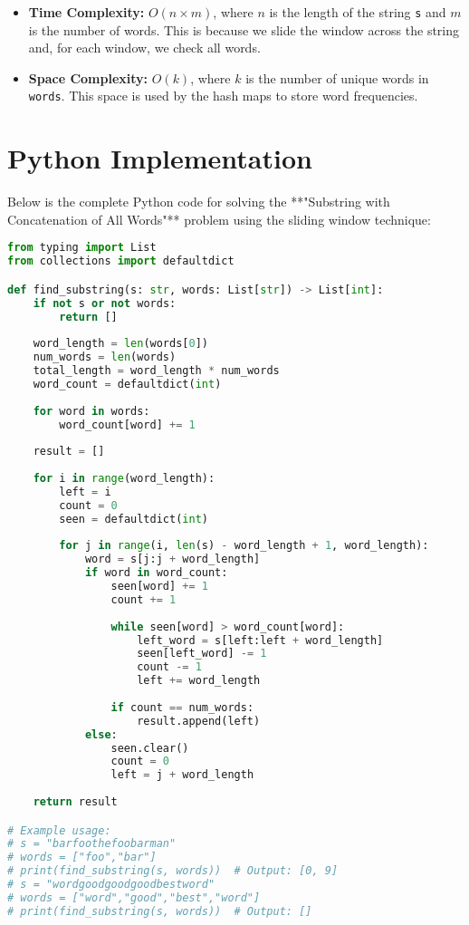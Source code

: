 \begin{itemize}
    \item \textbf{Time Complexity:} \(O(n \times m)\), where \(n\) is the length of the string \texttt{s} and \(m\) is the number of words. This is because we slide the window across the string and, for each window, we check all words.
    \item \textbf{Space Complexity:} \(O(k)\), where \(k\) is the number of unique words in \texttt{words}. This space is used by the hash maps to store word frequencies.
\end{itemize}

\section*{Python Implementation}


Below is the complete Python code for solving the **"Substring with Concatenation of All Words"** problem using the sliding window technique:

\begin{fullwidth}
\begin{lstlisting}[language=Python]
from typing import List
from collections import defaultdict

def find_substring(s: str, words: List[str]) -> List[int]:
    if not s or not words:
        return []
    
    word_length = len(words[0])
    num_words = len(words)
    total_length = word_length * num_words
    word_count = defaultdict(int)
    
    for word in words:
        word_count[word] += 1
    
    result = []
    
    for i in range(word_length):
        left = i
        count = 0
        seen = defaultdict(int)
        
        for j in range(i, len(s) - word_length + 1, word_length):
            word = s[j:j + word_length]
            if word in word_count:
                seen[word] += 1
                count += 1
                
                while seen[word] > word_count[word]:
                    left_word = s[left:left + word_length]
                    seen[left_word] -= 1
                    count -= 1
                    left += word_length
                
                if count == num_words:
                    result.append(left)
            else:
                seen.clear()
                count = 0
                left = j + word_length
    
    return result

# Example usage:
# s = "barfoothefoobarman"
# words = ["foo","bar"]
# print(find_substring(s, words))  # Output: [0, 9]
# s = "wordgoodgoodgoodbestword"
# words = ["word","good","best","word"]
# print(find_substring(s, words))  # Output: []
\end{lstlisting}
\end{fullwidth}

